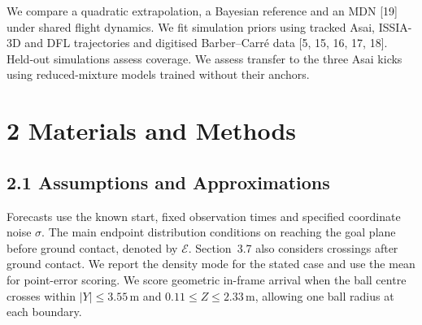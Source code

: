 We compare a quadratic extrapolation, a Bayesian reference and an MDN [19] under shared flight dynamics. We fit simulation priors using tracked Asai, ISSIA-3D and DFL trajectories and digitised Barber--Carr\'e data [5, 15, 16, 17, 18]. Held-out simulations assess coverage. We assess transfer to the three Asai kicks using reduced-mixture models trained without their anchors.

\section{2 Materials and Methods}
\subsection{2.1 Assumptions and Approximations}

Forecasts use the known start, fixed observation times and specified coordinate noise $\sigma$. The main endpoint distribution conditions on reaching the goal plane before ground contact, denoted by $\mathcal E$. Section~3.7 also considers crossings after ground contact. We report the density mode for the stated case and use the mean for point-error scoring. We score geometric in-frame arrival when the ball centre crosses within $|Y|\le 3.55\,\mathrm{m}$ and $0.11\le Z\le 2.33\,\mathrm{m}$, allowing one ball radius at each boundary.

